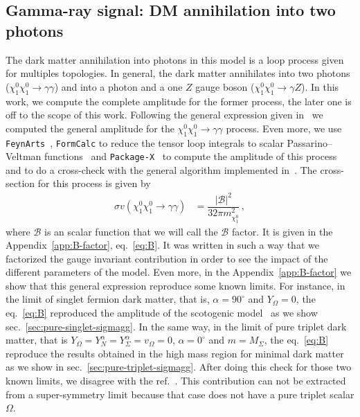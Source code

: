 \documentclass[12pt,letterpaper]{article}
\begin{document}
\subsection{Gamma-ray signal: DM annihilation into two photons}
\label{sec:gamma-ray}
  
The dark matter annihilation into photons in this model is a loop process given for multiples topologies. In general, the dark matter annihilates into two photons ($\chi_1^0\chi_1^0\rightarrow\gamma\gamma$) and into a photon and a one $Z$ gauge boson ($\chi_1^0\chi_1^0\rightarrow\gamma Z$). In this work, we compute the complete amplitude for the former process, the later one is off to the scope of this work.
%
Following the general expression given in~\cite{Garcia-Cely:2016hsk} we computed the general amplitude for the $\chi_1^0\chi_1^0\rightarrow\gamma\gamma$ process. Even more, we use \texttt{FeynArts}~\cite{Hahn:2000kx}, \texttt{FormCalc} to reduce the tensor loop integrals to scalar Passarino--Veltman functions~\cite{Passarino:1978jh} and \texttt{Package-X}~\cite{Patel:2015tea} to compute the amplitude of this process and to do a cross-check with the general algorithm implemented in~\cite{Garcia-Cely:2016hsk}.
%
The cross-section for this process is given by
%
\begin{align}
\label{eq:sigmav-gg}
\sigma v (\chi_1^0\chi_1^0\rightarrow\gamma\gamma) &= \dfrac{|\mathcal{B}|^2}{32\pi m_{\chi_1^0}^2}\,,
\end{align}
%
where $\mathcal{B}$ is an scalar function that we will call the $\mathcal{B}$ factor. It is given in the Appendix~\ref{app:B-factor}, eq.~\ref{eq:B}. It was written in such a way that we factorized the gauge invariant contribution in order to see the impact of the different parameters of the model.
Even more, in the Appendix~\ref{app:B-factor} we show that this general expression reproduce some known limits. For instance, in the limit of singlet fermion dark matter, that is, $\alpha =90^{\circ}$ and $Y_{\Omega}=0$, the eq.~\ref{eq:B} reproduced the amplitude of the scotogenic model~\cite{Garny:2015wea,Garcia-Cely:2016hsk} as we show sec.~\ref{sec:pure-singlet-sigmagg}.
In the same way, in the limit of pure triplet dark matter, that is $Y_{\Omega}=Y_{N}^{\alpha}=Y_{\Sigma}^{\alpha}=v_{\Omega}=0$, $\alpha =0^{\circ}$ and $m=M_{\Sigma}$,  the eq.~\ref{eq:B} reproduce the results obtained in the high mass region for minimal dark matter~\cite{Cirelli:2005uq} as we show in sec.~\ref{sec:pure-triplet-sigmagg}.
After doing this check for those two known limits, we disagree with the ref.~\cite{Choubey:2017yyn}. This contribution can not be extracted from a super-symmetry limit because that case does not have a pure triplet scalar $\Omega$.
\end{document}
